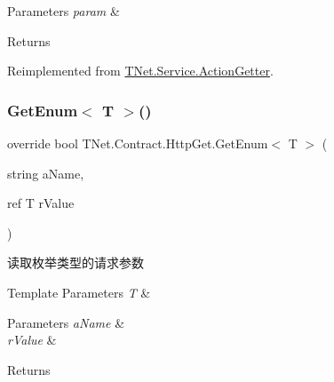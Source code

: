 \begin{DoxyParams}{Parameters}
{\em param} & \\
\hline
\end{DoxyParams}
\begin{DoxyReturn}{Returns}

\end{DoxyReturn}


Reimplemented from \mbox{\hyperlink{class_t_net_1_1_service_1_1_action_getter_aa31cf64fa46ebe6448abb26ed271c15b}{T\+Net.\+Service.\+Action\+Getter}}.

\mbox{\label{class_t_net_1_1_contract_1_1_http_get_aa2cbfe47248fe3d1abce83bf71d2f383}} 
\subsubsection{\texorpdfstring{Get\+Enum$<$ T $>$()}{GetEnum< T >()}\hspace{0.1cm}{\footnotesize\ttfamily [2/2]}}
{\footnotesize\ttfamily override bool T\+Net.\+Contract.\+Http\+Get.\+Get\+Enum$<$ T $>$ (\begin{DoxyParamCaption}\item[{string}]{a\+Name,  }\item[{ref T}]{r\+Value }\end{DoxyParamCaption})\hspace{0.3cm}{\ttfamily [virtual]}}



读取枚举类型的请求参数 


\begin{DoxyTemplParams}{Template Parameters}
{\em T} & \\
\hline
\end{DoxyTemplParams}

\begin{DoxyParams}{Parameters}
{\em a\+Name} & \\
\hline
{\em r\+Value} & \\
\hline
\end{DoxyParams}
\begin{DoxyReturn}{Returns}

\end{DoxyReturn}


